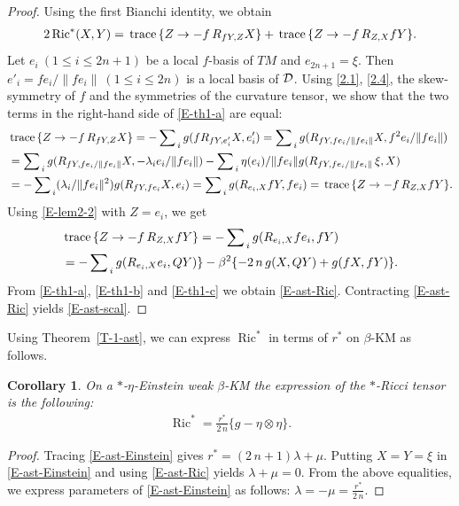 \documentclass[11pt,a4paper,twoside]{article}
\newtheorem{corollary}{Corollary}%
\def\Ric{\operatorname{Ric}}
\def\tr{{\rm\,trace\,}}
\begin{document}
{\begin{proof}
Using the first Bianchi identity, we obtain
\begin{align}\label{E-th1-a}
 2\Ric^\ast(X,Y) = \tr\{Z\to -f\,R_{fY,Z}X\}
 + \tr\{Z\to -f\,R_{Z, X} fY\}.
\end{align}
Let  $e_i\ (1\le i\le 2n+1)$ be a local $f$-basis of $TM$ and $e_{2n+1}=\xi$. Then $e'_i=fe_i/\|fe_i\|\ (1\le i\le 2n)$ is a local basis of ${\cal D}$.
Using \eqref{2.1}, \eqref{2.4}, the skew-symmetry of $f$ and the symmetries of the
curvature tensor, we show that the two terms in the right-hand side of \eqref{E-th1-a} are equal:
\begin{align}\label{E-th1-b}
\notag
 & \tr\{Z\to -f\,R_{fY,Z}X\}
 = -\sum\nolimits_{\,i} g(f R_{fY, e'_i}X, e'_i)
 = \sum\nolimits_{\,i} g(R_{fY, fe_i/\|fe_i\|}X, f^2 e_i/\|fe_i\|) \\
 \notag
 & = \sum\nolimits_{\,i} g(R_{fY, fe_i/\|fe_i\|}X,
 -\lambda_i e_i/\|fe_i\|)
 - \sum\nolimits_{\,i} \eta(e_i)/\|fe_i\|
 g(R_{fY, fe_i/\|fe_i\|}\,\xi, X) \\
 & = -\sum\nolimits_{\,i} (\lambda_i/\|fe_i\|^2)g(R_{fY, fe_i}X, e_i)
 = \sum\nolimits_{\,i} g(R_{e_i,X}fY, fe_i)
 = \tr\{Z\to -f\,R_{Z, X} fY\}.
\end{align}
Using \eqref{E-lem2-2} with $Z=e_i$, we get
\begin{align}\label{E-th1-c}
\notag
& \tr\{Z\to -f\,R_{Z, X} fY\}
= -\sum\nolimits_{\,i} g(R_{e_i,X}f e_i, fY) \\
& =-\sum\nolimits_{\,i} g(R_{e_i,X} e_i, QY) \}
 -\beta^2\{ - 2\,n\,g(X,QY)+ g(fX, fY)\}.
\end{align}
From \eqref{E-th1-a}, \eqref{E-th1-b} and \eqref{E-th1-c} we obtain \eqref{E-ast-Ric}.
Contracting \eqref{E-ast-Ric} yields \eqref{E-ast-scal}.
\end{proof}

Using Theorem~\ref{T-1-ast}, we can express $\Ric^\ast$ in terms of ${r}^\ast$ on $\beta$-KM as follows.

\begin{corollary}
On a $\ast$-$\eta$-Einstein weak $\beta$-KM the expression of the $\ast$-Ricci tensor is the following:
\begin{align*}%
 \Ric^\ast = \frac{{r}^\ast}{2\,n}\big\{g - \eta\otimes\eta\big\} .
\end{align*}
\end{corollary}

\begin{proof}
Tracing \eqref{E-ast-Einstein} gives ${r}^\ast=(2\,n+1)\lambda+\mu$.
Putting $X=Y=\xi$ in \eqref{E-ast-Einstein} and using \eqref{E-ast-Ric} yields $\lambda+\mu = 0$. From the above equalities, we express parameters of \eqref{E-ast-Einstein}
as follows: $\lambda=-\mu=\frac{{r}^\ast}{2\,n}$.
\end{proof}


}
\end{document}
